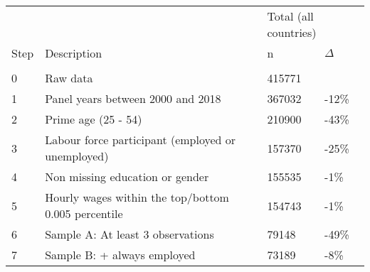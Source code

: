 \begin{tabular}{llll}
   \toprule 
 
&  & 
\multicolumn{2}{l}{Total (all countries)}
\\  
 
 
\multicolumn{1}{l}{Step} & 
\multicolumn{1}{l}{Description} 
& n & $\Delta$
\\ 
\cmidrule(lr){1-2}
\cmidrule(lr){3-4}
\\[-1.8ex]  
 
0 & Raw data & 415771 &  \\ 
  1 & Panel years between 2000 and 2018 & 367032 & -12\% \\ 
  2 & Prime age (25 - 54) & 210900 & -43\% \\ 
  3 & Labour force participant (employed or unemployed) & 157370 & -25\% \\ 
  4 & Non missing education or gender & 155535 & -1\% \\ 
  5 & Hourly wages within the top/bottom 0.005 percentile & 154743 & -1\% \\ 
  6 & Sample A: At least 3 observations & 79148 & -49\% \\ 
  7 & Sample B: + always employed & 73189 & -8\% \\ 
   \bottomrule 
\end{tabular}
